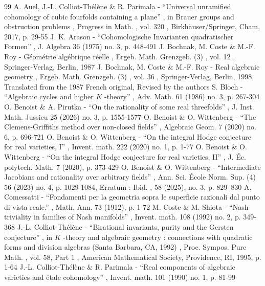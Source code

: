 \documentclass[11pt]{article}
\theoremstyle{definition}
\begin{document}
\begin{thebibliography}{99}
 A. Auel, J.-L. Colliot-Thélène \& R. Parimala - “Universal unramified cohomology of cubic fourfolds containing a plane” , in Brauer groups and obstruction problems , Progress in Math. , vol. 320 , Birkhäuser/Springer, Cham, 2017, p. 29-55
 J. K. Arason - “Cohomologische Invarianten quadratischer Formen” , J. Algebra 36 (1975) no. 3, p. 448-491
 J. Bochnak, M. Coste \& M.-F. Roy - Géométrie algébrique réelle , Ergeb. Math. Grenzgeb. (3) , vol. 12 , Springer-Verlag, Berlin, 1987
 J. Bochnak, M. Coste \& M.-F. Roy - Real algebraic geometry , Ergeb. Math. Grenzgeb. (3) , vol. 36 , Springer-Verlag, Berlin, 1998, Translated from the 1987 French original, Revised by the authors
 S. Bloch - “Algebraic cycles and higher $K$ -theory” , Adv. Math. 61 (1986) no. 3, p. 267-304
 O. Benoist \& A. Pirutka - “On the rationality of some real threefolds” , J. Inst. Math. Jussieu 25 (2026) no. 3, p. 1555-1577
 O. Benoist \& O. Wittenberg - “The Clemens-Griffiths method over non-closed fields” , Algebraic Geom. 7 (2020) no. 6, p. 696-721
 O. Benoist \& O. Wittenberg - “On the integral Hodge conjecture for real varieties, I” , Invent. math. 222 (2020) no. 1, p. 1-77
 O. Benoist \& O. Wittenberg - “On the integral Hodge conjecture for real varieties, II” , J. Éc. polytech. Math. 7 (2020), p. 373-429
 O. Benoist \& O. Wittenberg - “Intermediate Jacobians and rationality over arbitrary fields” , Ann. Sci. École Norm. Sup. (4) 56 (2023) no. 4, p. 1029-1084, Erratum : Ibid. , 58 (2025), no. 3, p. 829–830
 A. Comessatti - “Fondamenti per la geometria sopra le superficie razionali dal punto di vista reale.” , Math. Ann. 73 (1912), p. 1-72
 M. Coste \& M. Shiota - “Nash triviality in families of Nash manifolds” , Invent. math. 108 (1992) no. 2, p. 349-368
 J.-L. Colliot-Thélène - “Birational invariants, purity and the Gersten conjecture” , in $K$ -theory and algebraic geometry : connections with quadratic forms and division algebras (Santa Barbara, CA, 1992) , Proc. Sympos. Pure Math. , vol. 58, Part 1 , American Mathematical Society, Providence, RI, 1995, p. 1-64
 J.-L. Colliot-Thélène \& R. Parimala - “Real components of algebraic varieties and étale cohomology” , Invent. math. 101 (1990) no. 1, p. 81-99

\end{thebibliography}
\end{document}
